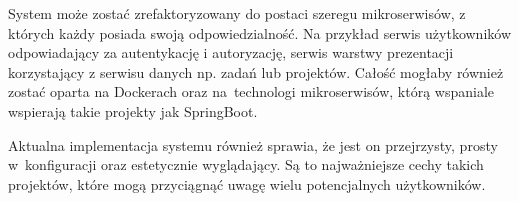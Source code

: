 System może zostać zrefaktoryzowany do postaci szeregu mikroserwisów, z których każdy posiada swoją odpowiedzialność. Na przykład serwis użytkowników odpowiadający za autentykację i autoryzację, serwis warstwy prezentacji korzystający z serwisu danych np. zadań lub projektów. Całość mogłaby również zostać oparta na Dockerach oraz na~technologi mikroserwisów, którą wspaniale wspierają takie projekty jak SpringBoot.

Aktualna implementacja systemu również sprawia, że jest on przejrzysty, prosty w~konfiguracji oraz estetycznie wyglądający. Są to najważniejsze cechy takich projektów, które mogą przyciągnąć uwagę wielu potencjalnych użytkowników.